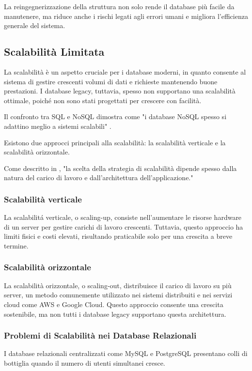 La reingegnerizzazione della struttura non solo rende il database più facile da manutenere, ma riduce anche i rischi legati agli errori umani e migliora l'efficienza generale del sistema.

\subsection{Scalabilità Limitata}
La scalabilità è un aspetto cruciale per i database moderni, in quanto consente al sistema di gestire crescenti volumi di dati e richieste mantenendo buone prestazioni. I database legacy, tuttavia, spesso non supportano una scalabilità ottimale, poiché non sono stati progettati per crescere con facilità. 

Il confronto tra SQL e NoSQL dimostra come "i database NoSQL spesso si adattino meglio a sistemi scalabili" \cite{Sto10}.

Esistono due approcci principali alla scalabilità: la scalabilità verticale e la scalabilità orizzontale.

Come descritto in \cite{Geo11}, "la scelta della strategia di scalabilità dipende spesso dalla natura del carico di lavoro e dall'architettura dell'applicazione."

\subsubsection{Scalabilità verticale}
La scalabilit\'a verticale, o scaling-up, consiste nell'aumentare le risorse hardware di un server per gestire carichi di lavoro crescenti. Tuttavia, questo approccio ha limiti fisici e costi elevati, risultando praticabile solo per una crescita a breve termine. 

\subsubsection{Scalabilità orizzontale}
La scalabilità orizzontale, o scaling-out, distribuisce il carico di lavoro su più server, un metodo comunemente utilizzato nei sistemi distribuiti e nei servizi cloud come AWS e Google Cloud. Questo approccio consente una crescita sostenibile, ma non tutti i database legacy supportano questa architettura.


\subsubsection{Problemi di Scalabilità nei Database Relazionali}
I database relazionali centralizzati come MySQL e PostgreSQL presentano colli di bottiglia quando il numero di utenti simultanei cresce.


